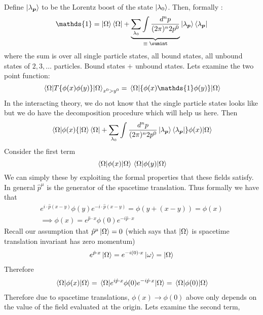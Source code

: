 Define $\ket{\lambda_{\bm{p}}}$ to be the Lorentz boost of the state $\ket{\lambda_0}$. Then, formally :
\begin{align}
    \mathds{1} = \ket{\Omega}\bra{\Omega} + \underbrace{\sum_{\lambda_0} \int \frac{d^n p}{(2\pi )^n 2p^0 } }_\text{$ \equiv \sumint$} \ket{\lambda_{\bm{p}}}\bra{\lambda_{\bm{p}}}
\end{align}
where the sum is over all single particle states, all bound states, all unbound states of $2, 3, \dots$ particles. Bound states $+$ unbound states. Lets examine the two point function:
\begin{equation}
     \mel{\Omega}{T\{ \phi(x) \phi(y) \}}{\Omega}_{x^0 > y^0} =  \mel{\Omega}{\{ \phi(x)\mathds{1} \phi(y) \}}{\Omega}
\end{equation}
In the interacting theory, we do not know that the single particle states looks like but we do have the decomposition procedure which will help us here. Then 
\begin{align}
     \mel{\Omega}{ \phi(x) \{ \ket{\Omega}\bra{\Omega} + \sum_{\lambda_0} \int \frac{d^n p}{(2\pi )^n 2p^0 } \ket{\lambda_{\bm{p}}}\bra{\lambda_{\bm{p}}} \} \phi(x) }{\Omega}
\end{align}
Consider the first term
\begin{equation}
    \mel{\Omega}{\phi(x)}{\Omega} \mel{\Omega}{\phi(y)}{\Omega}
\end{equation}
We can simply these by exploiting the formal properties that these fields satisfy. In general $\hat{p}^\mu$ is the generator of the spacetime translation. Thus formally we have that 
\begin{align}
    e^{i \cdot \hat{p} (x - y)} \phi(y)  e^{-i \cdot \hat{p} (x - y)} = \phi(y+(x-y)) = \phi(x) \\
    \implies \phi(x) = e^{\hat{p}\cdot x} \phi(0)  e^{-i\hat{p}\cdot x} 
\end{align}
Recall our assumption that $\hat{p}^\mu\ket{\Omega} = 0$ (which says that $\ket{\Omega}$ is spacetime translation invariant has zero momentum)
\begin{align}
    e^{\hat{p}\cdot x} \ket{\Omega} =  e^{-i(0)\cdot x} \ket{\omega} = \ket{\Omega} 
\end{align}
Therefore 
\begin{align}
    \mel{\Omega}{\phi(x)}{\Omega} = \mel{\Omega}{e^{i\hat{p}\cdot x} \phi(0) e^{-i\hat{p}\cdot x} }{\Omega} = \mel{\Omega}{\phi(0)}{\Omega}
\end{align}
Therefore due to spacetime translations, $\phi(x) \to \phi(0)$ above only depends on the value of the field evaluated at the origin. Lets examine the second term, 
